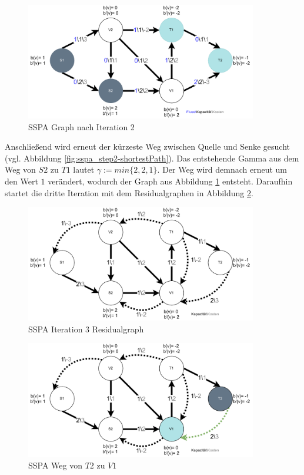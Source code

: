 \begin{figure}[H]
\centering
\includegraphics[width=0.9\textwidth]{img/anton/sspa-Step2-newGraph.pdf}
\caption{SSPA Graph nach Iteration 2}
\label{fig:sspa_step2-new-Graph}
\end{figure}

Anschließend wird erneut der kürzeste Weg zwischen Quelle und Senke gesucht (vgl. Abbildung \ref{fig:sspa_step2-shortestPath}). Das entstehende Gamma aus dem Weg von $S2$ zu $T1$ lautet $\gamma := min\{2, 2, 1\}$. Der Weg wird demnach erneut um den Wert $1$ verändert, wodurch der Graph aus Abbildung \ref{fig:sspa_step2-new-Graph} entsteht. Daraufhin startet die dritte Iteration mit dem Residualgraphen in Abbildung \ref{fig:sspa_step3-residual}.

\begin{figure}[H]
\centering
\includegraphics[width=0.9\textwidth]{img/anton/sspa-Step3-residual.pdf}
\caption{SSPA Iteration 3 Residualgraph}
\label{fig:sspa_step3-residual}
\end{figure}

\begin{figure}[H]
\centering
\includegraphics[width=0.9\textwidth]{img/anton/sspa-Step3-shortestPath.pdf}
\caption{SSPA Weg von $T2$ zu $V1$}
\label{fig:sspa_step3-shortestPath}
\end{figure}

